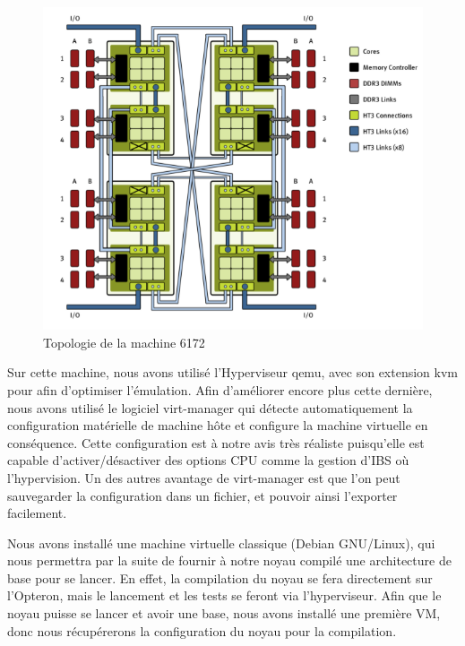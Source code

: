     \begin{figure}[H]
      \includegraphics[scale=0.4]{img/numa_arch_details.png}
      \caption{Topologie de la machine 6172}
      \label{f:numa_topology}
    \end{figure}

    Sur cette machine, nous avons utilisé l'Hyperviseur qemu, avec son extension
    kvm pour afin d'optimiser l'émulation. Afin d'améliorer encore plus cette
    dernière, nous avons utilisé le logiciel virt-manager qui détecte
    automatiquement la configuration matérielle de machine hôte et configure la
    machine virtuelle en conséquence. Cette configuration est à notre avis très
    réaliste puisqu'elle est capable d'activer/désactiver des options CPU comme
    la gestion d'IBS où l'hypervision. Un des autres avantage de virt-manager
    est que l'on peut sauvegarder la configuration dans un fichier, et pouvoir
    ainsi l'exporter facilement.

    Nous avons installé une machine virtuelle classique (Debian GNU/Linux), qui
    nous permettra par la suite de fournir à notre noyau compilé une
    architecture de base pour se lancer. En effet, la compilation du noyau se
    fera directement sur l'Opteron, mais le lancement et les tests se feront via
    l'hyperviseur. Afin que le noyau puisse se lancer et avoir une base, nous
    avons installé une première VM, donc nous récupérerons la configuration du
    noyau pour la compilation.

